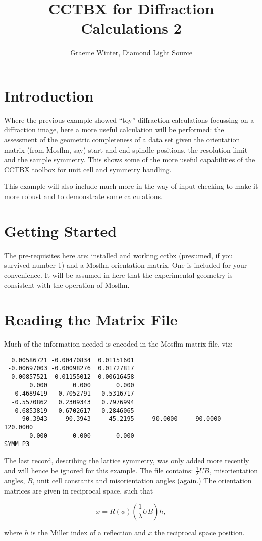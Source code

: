 \documentclass[a4paper, 11pt]{article}
\title{CCTBX for Diffraction Calculations 2}
\author{Graeme Winter, Diamond Light Source}
\begin{document}
\maketitle

\section{Introduction}

Where the previous example showed ``toy'' diffraction calculations focussing on a diffraction image, here a more useful calculation will be performed: the assessment of the geometric completeness of a data set given the orientation matrix (from Mosflm, say) start and end spindle positions, the resolution limit and the sample symmetry. This shows some of the more useful capabilities of the CCTBX toolbox for unit cell and symmetry handling.

This example will also include much more in the way of input checking to make it more robust and to demonstrate some calculations.

\section{Getting Started}

The pre-requisites here are: installed and working cctbx (presumed, if you survived number 1) and a Mosflm orientation matrix. One is included for your convenience. It will be assumed in here that the experimental geometry is consistent with the operation of Mosflm.

\section{Reading the Matrix File}

Much of the information needed is encoded in the Mosflm matrix file, viz:

{\small
\begin{verbatim}
  0.00586721 -0.00470834  0.01151601
 -0.00697003 -0.00098276  0.01727817
 -0.00857521 -0.01155012 -0.00616458
       0.000       0.000       0.000
   0.4689419  -0.7052791   0.5316717
  -0.5570862   0.2309343   0.7976994
  -0.6853819  -0.6702617  -0.2846065
     90.3943     90.3943     45.2195     90.0000     90.0000    120.0000
       0.000       0.000       0.000
SYMM P3       
\end{verbatim}
}

The last record, describing the lattice symmetry, was only added more recently and will hence be ignored for this example. The file contains: $\frac{1}{\lambda} U B$, misorientation angles, $B$, unit cell constants and misorientation angles (again.) The orientation matrices are given in reciprocal space, such that 

\begin{equation}
x = R(\phi) (\frac{1}{\lambda} U B) h,
\end{equation}

\noindent
where $h$ is the Miller index of a reflection and $x$ the reciprocal space position. 
\end{document}
